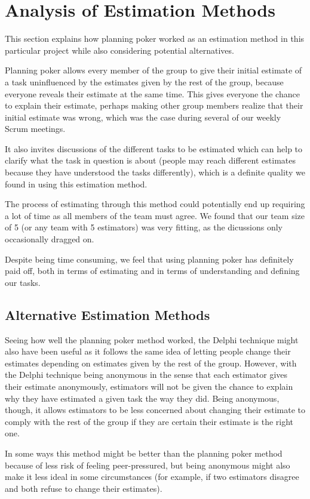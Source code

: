 \section{Analysis of Estimation Methods}
\label{sec:AnalysisEstimation}
This section explains how planning poker worked as an estimation method in this
particular project while also considering potential alternatives.

Planning poker allows every member of the group to give their initial estimate
of a task uninfluenced by the estimates given by the rest of the group, because
everyone reveals their estimate at the same time. This gives everyone the chance
to explain their estimate, perhaps making other group members realize that their
initial estimate was wrong, which was the case during several of our weekly Scrum
meetings.

It also invites discussions of the different tasks to be estimated which can
help to clarify what the task in question is about (people may reach different
estimates because they have understood the tasks differently), which is a
definite quality we found in using this estimation method.

The process of estimating through this method could potentially end up requiring
a lot of time as all members of the team must agree. We found that our team size
of 5 (or any team with 5 estimators) was very fitting, as the dicussions only
occasionally dragged on.

Despite being time consuming, we feel that using planning poker has definitely
paid off, both in terms of estimating and in terms of understanding and defining
our tasks.

\subsection{Alternative Estimation Methods}
Seeing how well the planning poker method worked, the Delphi
technique\cite{caye} might also have been useful as it follows the same idea of
letting people change their estimates depending on estimates given by the rest
of the group. However, with the Delphi technique being anonymous in the sense
that each estimator gives their estimate anonymously, estimators will not be
given the chance to explain why they have estimated a given task the way they
did. Being anonymous, though, it allows estimators to be less concerned about
changing their estimate to comply with the rest of the group if they are certain
their estimate is the right one.

In some ways this method might be better than the planning poker method because
of less risk of feeling peer-pressured, but being anonymous might also make it
less ideal in some circumstances (for example, if two estimators disagree and
both refuse to change their estimates).
